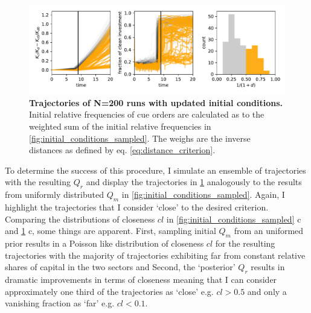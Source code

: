 \begin{figure}[t]
  \centering
  \includegraphics[width= \textwidth]{figures/initial_condition_fitted.pdf}
  \caption[Trajectories of N=200 runs with updated initial conditions]{\textbf{Trajectories of N=200 runs with updated initial conditions.} Initial relative frequencies of cue orders are calculated as to the weighted sum of the initial relative frequencies in \cref{fig:initial_conditions_sampled}. The weighs are the inverse distances as defined by eq. \ref{eq:distance_criterion}.}
  \label{fig:initial_conditions_fitted}
\end{figure}

To determine the success of this procedure, I simulate an ensemble of trajectories with the resulting $Q_r$ and display the trajectories in \cref{fig:initial_conditions_fitted} analogously to the results from uniformly distributed $Q_m$ in \cref{fig:initial_conditions_sampled}. Again, I highlight the trajectories that I consider `close' to the desired criterion. Comparing the distributions of closeness $cl$ in \cref{fig:initial_conditions_sampled} c and \cref{fig:initial_conditions_fitted} c, some things are apparent. First, sampling initial $Q_m$ from an uniformed prior results in a Poisson like distribution of closeness $cl$ for the resulting trajectories with the majority of trajectories exhibiting far from constant relative shares of capital in the two sectors and Second, the `posterior' $Q_r$ results in dramatic improvements in terms of closeness meaning that I can consider approximately one third of the trajectories as `close' e.g. $cl>0.5$ and only a vanishing fraction as `far' e.g. $cl<0.1$.\\


